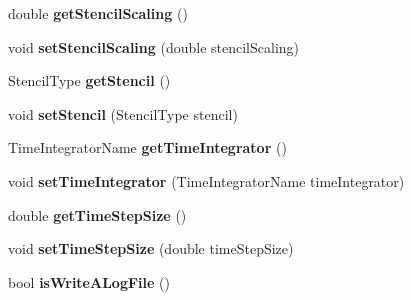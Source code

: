 \begin{DoxyCompactItemize}
\item 
\hypertarget{classnatrium_1_1SolverConfiguration_adb7b45c43f97f0ce2ca288f92a32b577}{double {\bfseries get\-Stencil\-Scaling} ()}\label{classnatrium_1_1SolverConfiguration_adb7b45c43f97f0ce2ca288f92a32b577}

\item 
\hypertarget{classnatrium_1_1SolverConfiguration_a1dff19c0a3cc7386bd629dd72e59ac42}{void {\bfseries set\-Stencil\-Scaling} (double stencil\-Scaling)}\label{classnatrium_1_1SolverConfiguration_a1dff19c0a3cc7386bd629dd72e59ac42}

\item 
\hypertarget{classnatrium_1_1SolverConfiguration_a962af94c9599c393d8a16d7f5ae04d6c}{Stencil\-Type {\bfseries get\-Stencil} ()}\label{classnatrium_1_1SolverConfiguration_a962af94c9599c393d8a16d7f5ae04d6c}

\item 
\hypertarget{classnatrium_1_1SolverConfiguration_afa50192447fb027d0250a29b1ea86d1a}{void {\bfseries set\-Stencil} (Stencil\-Type stencil)}\label{classnatrium_1_1SolverConfiguration_afa50192447fb027d0250a29b1ea86d1a}

\item 
\hypertarget{classnatrium_1_1SolverConfiguration_ac7e6189aaa1b54016993e852999376eb}{Time\-Integrator\-Name {\bfseries get\-Time\-Integrator} ()}\label{classnatrium_1_1SolverConfiguration_ac7e6189aaa1b54016993e852999376eb}

\item 
\hypertarget{classnatrium_1_1SolverConfiguration_ac58399f50e64bc8b0efde5b51e246aeb}{void {\bfseries set\-Time\-Integrator} (Time\-Integrator\-Name time\-Integrator)}\label{classnatrium_1_1SolverConfiguration_ac58399f50e64bc8b0efde5b51e246aeb}

\item 
\hypertarget{classnatrium_1_1SolverConfiguration_ae446f5d60a09f30a43258a5ec2bebbbf}{double {\bfseries get\-Time\-Step\-Size} ()}\label{classnatrium_1_1SolverConfiguration_ae446f5d60a09f30a43258a5ec2bebbbf}

\item 
\hypertarget{classnatrium_1_1SolverConfiguration_aab0d1b737708c92e83ebe3424b3bed4d}{void {\bfseries set\-Time\-Step\-Size} (double time\-Step\-Size)}\label{classnatrium_1_1SolverConfiguration_aab0d1b737708c92e83ebe3424b3bed4d}

\item 
\hypertarget{classnatrium_1_1SolverConfiguration_ac97dc43684f8a690de0f3e9c132dda02}{bool {\bfseries is\-Write\-A\-Log\-File} ()}\label{classnatrium_1_1SolverConfiguration_ac97dc43684f8a690de0f3e9c132dda02}


\end{DoxyCompactItemize}
